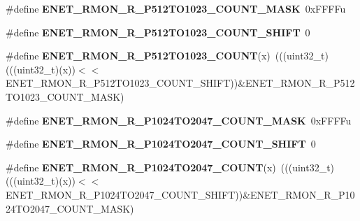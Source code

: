 \begin{DoxyCompactItemize}
\item 
\#define {\bfseries E\+N\+E\+T\+\_\+\+R\+M\+O\+N\+\_\+\+R\+\_\+\+P512\+T\+O1023\+\_\+\+C\+O\+U\+N\+T\+\_\+\+M\+A\+SK}~0x\+F\+F\+F\+Fu\hypertarget{group__ENET__Register__Masks_ga0b38c45c87433335a5cc1e65eaca9f67}{}\label{group__ENET__Register__Masks_ga0b38c45c87433335a5cc1e65eaca9f67}

\item 
\#define {\bfseries E\+N\+E\+T\+\_\+\+R\+M\+O\+N\+\_\+\+R\+\_\+\+P512\+T\+O1023\+\_\+\+C\+O\+U\+N\+T\+\_\+\+S\+H\+I\+FT}~0\hypertarget{group__ENET__Register__Masks_ga2cc28edd9bf71e3f65d514fd9e1ba3ba}{}\label{group__ENET__Register__Masks_ga2cc28edd9bf71e3f65d514fd9e1ba3ba}

\item 
\#define {\bfseries E\+N\+E\+T\+\_\+\+R\+M\+O\+N\+\_\+\+R\+\_\+\+P512\+T\+O1023\+\_\+\+C\+O\+U\+NT}(x)~(((uint32\+\_\+t)(((uint32\+\_\+t)(x))$<$$<$E\+N\+E\+T\+\_\+\+R\+M\+O\+N\+\_\+\+R\+\_\+\+P512\+T\+O1023\+\_\+\+C\+O\+U\+N\+T\+\_\+\+S\+H\+I\+FT))\&E\+N\+E\+T\+\_\+\+R\+M\+O\+N\+\_\+\+R\+\_\+\+P512\+T\+O1023\+\_\+\+C\+O\+U\+N\+T\+\_\+\+M\+A\+SK)\hypertarget{group__ENET__Register__Masks_ga116549b0b0b2c1813d9ffc1f6657a07d}{}\label{group__ENET__Register__Masks_ga116549b0b0b2c1813d9ffc1f6657a07d}

\item 
\#define {\bfseries E\+N\+E\+T\+\_\+\+R\+M\+O\+N\+\_\+\+R\+\_\+\+P1024\+T\+O2047\+\_\+\+C\+O\+U\+N\+T\+\_\+\+M\+A\+SK}~0x\+F\+F\+F\+Fu\hypertarget{group__ENET__Register__Masks_ga9e6dbfdcd74c5b14ff7987973c952753}{}\label{group__ENET__Register__Masks_ga9e6dbfdcd74c5b14ff7987973c952753}

\item 
\#define {\bfseries E\+N\+E\+T\+\_\+\+R\+M\+O\+N\+\_\+\+R\+\_\+\+P1024\+T\+O2047\+\_\+\+C\+O\+U\+N\+T\+\_\+\+S\+H\+I\+FT}~0\hypertarget{group__ENET__Register__Masks_gacf33c89b25640b4d44a0cc1a7e8ee178}{}\label{group__ENET__Register__Masks_gacf33c89b25640b4d44a0cc1a7e8ee178}

\item 
\#define {\bfseries E\+N\+E\+T\+\_\+\+R\+M\+O\+N\+\_\+\+R\+\_\+\+P1024\+T\+O2047\+\_\+\+C\+O\+U\+NT}(x)~(((uint32\+\_\+t)(((uint32\+\_\+t)(x))$<$$<$E\+N\+E\+T\+\_\+\+R\+M\+O\+N\+\_\+\+R\+\_\+\+P1024\+T\+O2047\+\_\+\+C\+O\+U\+N\+T\+\_\+\+S\+H\+I\+FT))\&E\+N\+E\+T\+\_\+\+R\+M\+O\+N\+\_\+\+R\+\_\+\+P1024\+T\+O2047\+\_\+\+C\+O\+U\+N\+T\+\_\+\+M\+A\+SK)\hypertarget{group__ENET__Register__Masks_ga48a1c9b8f8ca8200a90af7f0b7948e27}{}\label{group__ENET__Register__Masks_ga48a1c9b8f8ca8200a90af7f0b7948e27}


\end{DoxyCompactItemize}
